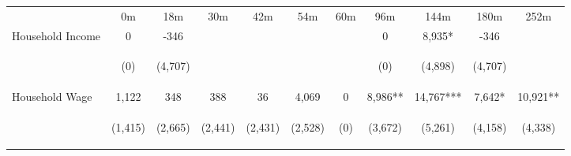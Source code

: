 \begin{tabular}{lcccccccccc}
\hline \noalign{\smallskip} & 0m & 18m & 30m & 42m & 54m & 60m & 96m & 144m & 180m & 252m\\
\noalign{\smallskip}\hline \noalign{\smallskip}Household Income & 0 & -346 &  &  &  &  & 0 & 8,935* & -346 & \\
 & \begin{footnotesize}(0)\end{footnotesize} & \begin{footnotesize}(4,707)\end{footnotesize} & \begin{footnotesize}\end{footnotesize} & \begin{footnotesize}\end{footnotesize} & \begin{footnotesize}\end{footnotesize} & \begin{footnotesize}\end{footnotesize} & \begin{footnotesize}(0)\end{footnotesize} & \begin{footnotesize}(4,898)\end{footnotesize} & \begin{footnotesize}(4,707)\end{footnotesize} & \begin{footnotesize}\end{footnotesize}\\
\noalign{\smallskip}Household Wage & 1,122 & 348 & 388 & 36 & 4,069 & 0 & 8,986** & 14,767*** & 7,642* & 10,921**\\
 & \begin{footnotesize}(1,415)\end{footnotesize} & \begin{footnotesize}(2,665)\end{footnotesize} & \begin{footnotesize}(2,441)\end{footnotesize} & \begin{footnotesize}(2,431)\end{footnotesize} & \begin{footnotesize}(2,528)\end{footnotesize} & \begin{footnotesize}(0)\end{footnotesize} & \begin{footnotesize}(3,672)\end{footnotesize} & \begin{footnotesize}(5,261)\end{footnotesize} & \begin{footnotesize}(4,158)\end{footnotesize} & \begin{footnotesize}(4,338)\end{footnotesize}\\

\end{tabular}
